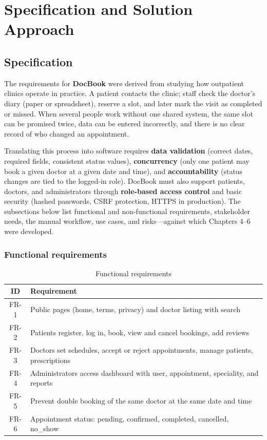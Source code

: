 \chapter{Specification and Solution Approach}

\section{Specification}
\label{sec:specification}

The requirements for \textbf{DocBook} were derived from studying how outpatient clinics operate in practice. A patient contacts the clinic; staff check the doctor's diary (paper or spreadsheet), reserve a slot, and later mark the visit as completed or missed. When several people work without one shared system, the same slot can be promised twice, data can be entered incorrectly, and there is no clear record of who changed an appointment.

Translating this process into software requires \textbf{data validation} (correct dates, required fields, consistent status values), \textbf{concurrency} (only one patient may book a given doctor at a given date and time), and \textbf{accountability} (status changes are tied to the logged-in role). DocBook must also support patients, doctors, and administrators through \textbf{role-based access control} and basic security (hashed passwords, CSRF protection, HTTPS in production). The subsections below list functional and non-functional requirements, stakeholder needs, the manual workflow, use cases, and risks---against which Chapters 4--6 were developed.

\subsection{Functional requirements}

\begin{table}[htbp]
  \centering
  \caption{Functional requirements}
  \begin{tabular}{@{}cl@{}}
    \toprule
    ID & Requirement \\
    \midrule
    FR-1 & Public pages (home, terms, privacy) and doctor listing with search \\
    FR-2 & Patients register, log in, book, view and cancel bookings, add reviews \\
    FR-3 & Doctors set schedules, accept or reject appointments, manage patients, prescriptions \\
    FR-4 & Administrators access dashboard with user, appointment, speciality, and reports \\
    FR-5 & Prevent double booking of the same doctor at the same date and time \\
    FR-6 & Appointment status: pending, confirmed, completed, cancelled, no\_show \\
    \bottomrule
  \end{tabular}
\end{table}

